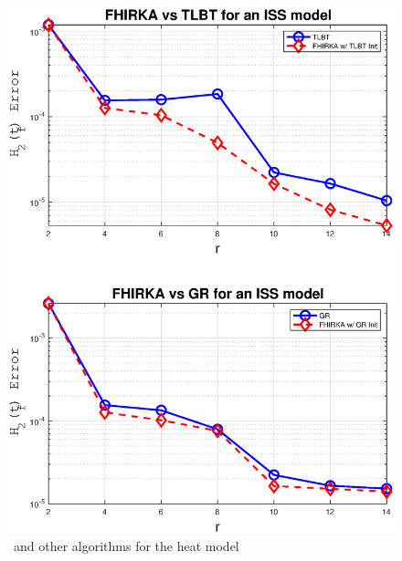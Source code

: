 \documentclass[twocolumn]{autart}
\begin{document}
 \begin{figure}%
 \centering
  \includegraphics [scale=0.5]{fig2i}
 \caption{\FH \ and other algorithms for the heat model \label{fig:iss}}
 \end{figure}
\end{document}
